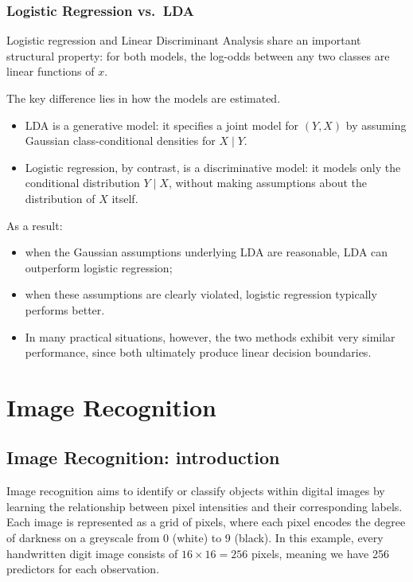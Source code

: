 \documentclass[
  letterpaper,
  DIV=11,
  numbers=noendperiod]{scrartcl}
\providecommand{\tightlist}{%
  \setlength{\itemsep}{0pt}\setlength{\parskip}{0pt}}\usepackage{longtable,booktabs,array}
\begin{document}
\subsubsection{Logistic Regression
vs.~LDA}\label{logistic-regression-vs.-lda}

Logistic regression and Linear Discriminant Analysis share an important
structural property: for both models, the log-odds between any two
classes are linear functions of \(x\).

The key difference lies in how the models are estimated.

\begin{itemize}
\tightlist
\item
  LDA is a generative model: it specifies a joint model for \((Y, X)\)
  by assuming Gaussian class-conditional densities for \(X \mid Y\).
\item
  Logistic regression, by contrast, is a discriminative model: it models
  only the conditional distribution \(Y \mid X\), without making
  assumptions about the distribution of \(X\) itself.
\end{itemize}

As a result:

\begin{itemize}
\tightlist
\item
  when the Gaussian assumptions underlying LDA are reasonable, LDA can
  outperform logistic regression;
\item
  when these assumptions are clearly violated, logistic regression
  typically performs better.
\item
  In many practical situations, however, the two methods exhibit very
  similar performance, since both ultimately produce linear decision
  boundaries.
\end{itemize}

\section{Image Recognition}\label{image-recognition}

\subsection{Image Recognition:
introduction}\label{image-recognition-introduction}

Image recognition aims to identify or classify objects within digital
images by learning the relationship between pixel intensities and their
corresponding labels. Each image is represented as a grid of pixels,
where each pixel encodes the degree of darkness on a greyscale from 0
(white) to 9 (black). In this example, every handwritten digit image
consists of \(16 \times 16 = 256\) pixels, meaning we have 256
predictors for each observation.
\end{document}
